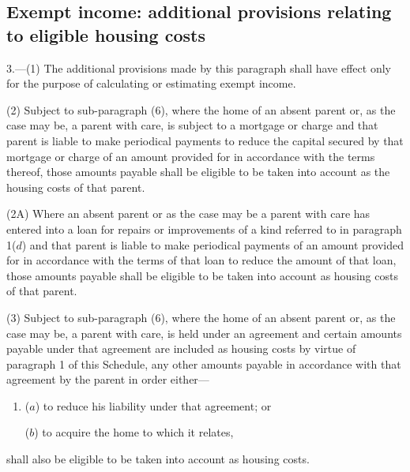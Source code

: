 \documentclass[12pt,a4paper]{article}
\begin{document}
\subsection*{\sloppy Exempt income: additional provisions relating to eligible housing costs}

3.—(1) The additional provisions made by this paragraph shall have effect only for the purpose of calculating or estimating exempt income.

(2) Subject to sub-paragraph (6), where the home of an absent parent or, as the case may be, a parent with care, is subject to a mortgage or charge and that parent 
is liable to make periodical payments  %
to reduce the capital secured by that mortgage or charge of an amount provided for in accordance with the terms thereof, 
those amounts payable  %
shall be eligible to be taken into account as the housing costs of that parent.

(2A) Where an absent parent or as the case may be a parent with care has entered into a loan for repairs or improvements of a kind referred to in paragraph 1($d$) and that parent 
is liable to make periodical payments  %
of an amount provided for in accordance with the terms of that loan to reduce the amount of that loan, 
those amounts payable  %
shall be eligible to be taken into account as housing costs of that parent.

(3) Subject to sub-paragraph (6), where the home of an absent parent or, as the case may be, a parent with care, is held under an agreement and 
certain amounts payable  %
under that agreement are included as housing costs by virtue of paragraph 1 of this Schedule, 
any other amounts payable  %
in accordance with that agreement by the parent in order either—
\begin{enumerate}\item[]
($a$) to reduce his liability under that agreement; or

($b$) to acquire the home to which it relates,
\end{enumerate}
shall also be eligible to be taken into account as housing costs.
\end{document}
